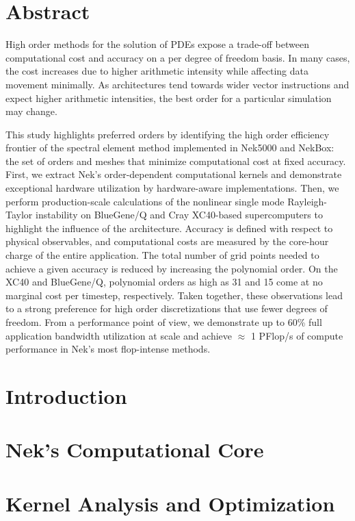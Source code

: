 \section{Abstract}
High order methods for the solution of PDEs expose a trade-off between computational cost and accuracy on a per degree of freedom basis.
In many cases, the cost increases due to higher arithmetic intensity while affecting data movement minimally.
As architectures tend towards wider vector instructions and expect higher arithmetic intensities, the best order for a particular simulation may change.

This study highlights preferred orders by identifying the high order efficiency frontier of the spectral element method implemented in Nek5000 and NekBox: the set of orders and meshes that minimize computational cost at fixed accuracy.
First, we extract Nek's order-dependent computational kernels and demonstrate exceptional hardware utilization by hardware-aware implementations.
Then, we perform production-scale calculations of the nonlinear single mode Rayleigh-Taylor instability on BlueGene/Q and Cray XC40-based supercomputers to highlight the influence of the architecture.
Accuracy is defined with respect to physical observables, and computational costs are measured by the core-hour charge of the entire application.
The total number of grid points needed to achieve a given accuracy is reduced by increasing the polynomial order.
On the XC40 and BlueGene/Q, polynomial orders as high as 31 and 15 come at no marginal cost per timestep, respectively.
Taken together, these observations lead to a strong preference for high order discretizations that use fewer degrees of freedom.
From a performance point of view, we demonstrate up to 60\% full application bandwidth utilization at scale and achieve $\approx$ 1 PFlop/s of compute performance in Nek's most flop-intense methods.

\section{Introduction}
\label{sec:introduction}


\section{Nek's Computational Core}
\label{sec:math}


\section{Kernel Analysis and Optimization}
\label{sec:implementation}


